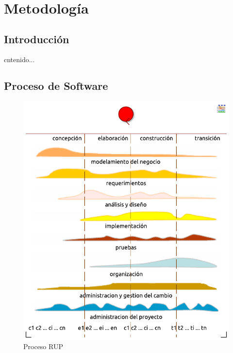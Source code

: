 \chapter{Metodología}
\section{Introducción}
cntenido...
\newpage

\section{Proceso de Software}

\begin{figure}[h!]
	\centering
	\includegraphics[width=0.7\linewidth]{proyecto/metodologia/imgs/rup}
	\caption{Proceso RUP \cite{SBol,Bas,Bab,Arc}}
\end{figure}


%

